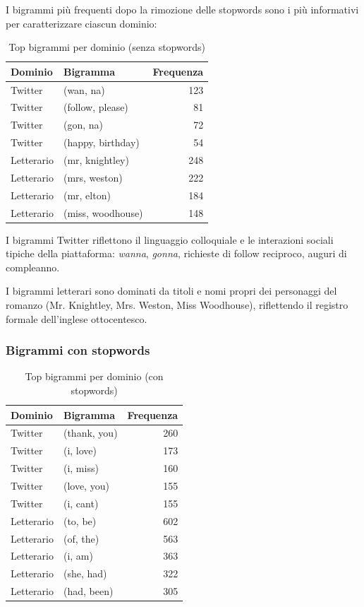 \documentclass[12pt, a4paper]{article}
\begin{document}
I bigrammi più frequenti dopo la rimozione delle stopwords sono i più
informativi per caratterizzare ciascun dominio:

\begin{table}[H]
\centering
\begin{tabular}{llr}
\toprule
\textbf{Dominio} & \textbf{Bigramma} & \textbf{Frequenza} \\
\midrule
Twitter & (wan, na)         & 123 \\
Twitter & (follow, please)  & 81 \\
Twitter & (gon, na)         & 72 \\
Twitter & (happy, birthday) & 54 \\
\midrule
Letterario & (mr, knightley)   & 248 \\
Letterario & (mrs, weston)     & 222 \\
Letterario & (mr, elton)       & 184 \\
Letterario & (miss, woodhouse) & 148 \\
\bottomrule
\end{tabular}
\caption{Top bigrammi per dominio (senza stopwords)}
\end{table}

I bigrammi Twitter riflettono il linguaggio colloquiale e le interazioni
sociali tipiche della piattaforma: \textit{wanna}, \textit{gonna},
richieste di follow reciproco, auguri di compleanno.

I bigrammi letterari sono dominati da titoli e nomi propri dei personaggi
del romanzo (Mr. Knightley, Mrs. Weston, Miss Woodhouse), riflettendo
il registro formale dell'inglese ottocentesco.

\subsubsection{Bigrammi con stopwords}

\begin{table}[H]
\centering
\begin{tabular}{llr}
\toprule
\textbf{Dominio} & \textbf{Bigramma} & \textbf{Frequenza} \\
\midrule
Twitter & (thank, you)  & 260 \\
Twitter & (i, love)     & 173 \\
Twitter & (i, miss)     & 160 \\
Twitter & (love, you)   & 155 \\
Twitter & (i, cant)     & 155 \\
\midrule
Letterario & (to, be)    & 602 \\
Letterario & (of, the)   & 563 \\
Letterario & (i, am)     & 363 \\
Letterario & (she, had)  & 322 \\
Letterario & (had, been) & 305 \\
\bottomrule
\end{tabular}
\caption{Top bigrammi per dominio (con stopwords)}
\end{table}
\end{document}
